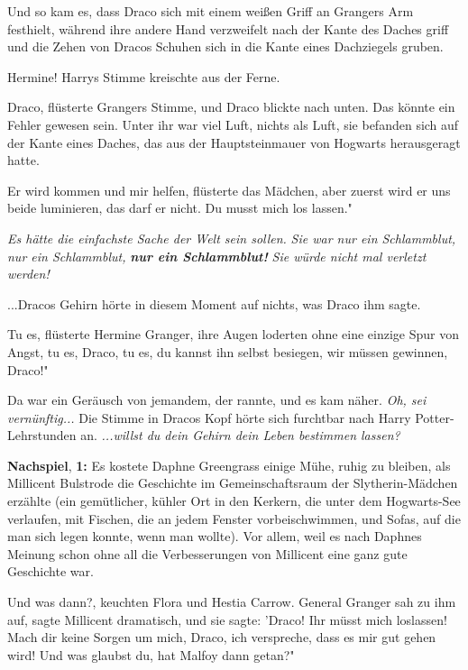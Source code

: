 Und so kam es, dass Draco sich mit einem weißen Griff an Grangers Arm festhielt,
während ihre andere Hand verzweifelt nach der Kante des Daches griff und die
Zehen von Dracos Schuhen sich in die Kante eines Dachziegels gruben.

\glqq Hermine!\grqq{} Harrys Stimme kreischte aus der Ferne.

\glqq Draco\grqq{}, flüsterte Grangers Stimme, und Draco blickte nach unten. Das
könnte ein Fehler gewesen sein. Unter ihr war viel Luft, nichts als Luft, sie
befanden sich auf der Kante eines Daches, das aus der Hauptsteinmauer von
Hogwarts herausgeragt hatte.

\glqq Er wird kommen und mir helfen\grqq{}, flüsterte das Mädchen, \glqq aber
zuerst wird er uns beide luminieren, das darf er nicht. Du musst mich los
lassen."

\emph{ Es hätte die einfachste Sache der Welt sein sollen.}
\emph{Sie war nur ein Schlammblut, nur ein Schlammblut, }\textbf{\emph{nur ein
Schlammblut!}}\emph{ Sie würde nicht mal verletzt werden!}

...Dracos Gehirn hörte in diesem Moment auf nichts, was Draco ihm sagte.

\glqq Tu es\grqq{}, flüsterte Hermine Granger, ihre Augen loderten ohne eine
einzige Spur von Angst, \glqq tu es, Draco, tu es, du kannst ihn selbst
besiegen, wir müssen gewinnen, Draco!"

Da war ein Geräusch von jemandem, der rannte, und es kam näher. \emph{ Oh, sei
vernünftig... } Die Stimme in Dracos Kopf hörte sich furchtbar nach Harry
Potter-Lehrstunden an.
\emph{ ...willst du dein Gehirn dein Leben bestimmen lassen?}

\textbf{Nachspiel}, \textbf{1:} Es kostete Daphne Greengrass einige Mühe, ruhig
zu bleiben, als Millicent Bulstrode die Geschichte im Gemeinschaftsraum der
Slytherin-Mädchen erzählte (ein gemütlicher, kühler Ort in den Kerkern, die
unter dem Hogwarts-See verlaufen, mit Fischen, die an jedem Fenster
vorbeischwimmen, und Sofas, auf die man sich legen konnte, wenn man wollte). Vor
allem, weil es nach Daphnes Meinung schon ohne all die Verbesserungen von
Millicent eine ganz gute Geschichte war.

\glqq Und was dann?\grqq{}, keuchten Flora und Hestia Carrow. \glqq General
Granger sah zu ihm auf\grqq{}, sagte Millicent dramatisch, \glqq und sie sagte:
'Draco! Ihr müsst mich loslassen! Mach dir keine Sorgen um mich, Draco, ich
verspreche, dass es mir gut gehen wird! Und was glaubst du, hat Malfoy dann
getan?"

